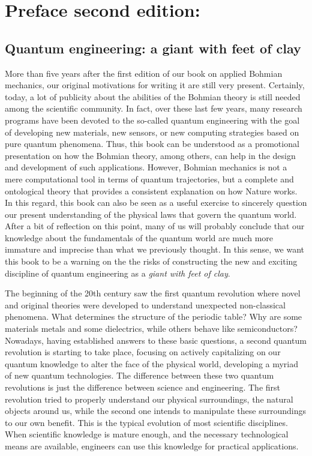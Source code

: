\documentclass[nofootinbib, secnumarabic, amsmath, nobibnotes,11pt,aps,pra, floatfix]{revtex4-1}
\begin{document}
\section{Preface second edition:\label{preface2}}
\subsection*{Quantum engineering: a giant with feet of clay}

More than five years after the first edition of our book on applied Bohmian mechanics, our original motivations for writing it are still very present. Certainly, today, a lot of publicity about the abilities of the Bohmian theory is still needed among the scientific community. In fact, over these last few years, many research programs have been devoted to the so-called quantum engineering with the goal of developing new materials, new sensors, or new computing strategies based on pure quantum phenomena. Thus, this book can be understood as a promotional presentation on how the Bohmian theory, among others, can help in the design and development of such applications. However, Bohmian mechanics is not a mere computational tool in terms of quantum trajectories, but a complete and ontological theory that provides a consistent explanation on how Nature works. In this regard, this book can also be seen as a useful exercise to sincerely question our present understanding of the physical laws that govern the quantum world. After a bit of reflection on this point, many of us will probably conclude that our knowledge about the fundamentals of the quantum world are much more immature and imprecise than what we previously thought.  In this sense, we want this book to be a warning on the the risks of constructing the new and exciting discipline of quantum engineering as a \emph{giant with feet of clay}. 

The beginning of the 20th century saw the first quantum revolution where novel and original theories were developed to understand unexpected non-classical phenomena. What determines the structure of the periodic table? Why are some materials metals and some dielectrics, while others behave like semiconductors? Nowadays, having established answers to these basic questions, a second quantum revolution is starting to take place, focusing on actively capitalizing on our quantum knowledge to alter the face of the physical world, developing a myriad of new quantum technologies. The difference between these two quantum revolutions is just the difference between science and engineering. The first revolution tried to properly understand our physical surroundings, the natural objects around us, while the second one intends to manipulate these surroundings to our own benefit. This is the typical evolution of most scientific disciplines. When scientific knowledge is mature enough, and the necessary technological means are available, engineers can use this knowledge for practical applications.
\end{document}
